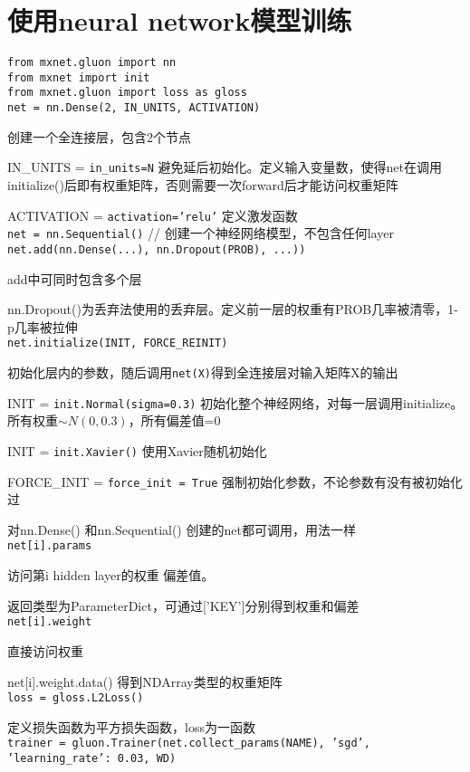 \documentclass[UTF8]{ctexart}
\begin{document}
\section{使用neural network模型训练}

\noindent \texttt{from mxnet.gluon import nn}\\
\texttt{from mxnet import init}\\
\texttt{from mxnet.gluon import loss as gloss}\\
\texttt{net = nn.Dense(2, IN\_UNITS, ACTIVATION)}

  创建一个全连接层，包含2个节点

  IN\_UNITS = \texttt{in\_units=N} 避免延后初始化。定义输入变量数，使得net在调用initialize()后即有权重矩阵，否则需要一次forward后才能访问权重矩阵
  
  ACTIVATION = \texttt{activation='relu'} 定义激发函数\\
\texttt{net = nn.Sequential()} // 创建一个神经网络模型，不包含任何layer\\
\texttt{net.add(nn.Dense(...), nn.Dropout(PROB), ...))}

  add中可同时包含多个层
  
  nn.Dropout()为丢弃法使用的丢弃层。定义前一层的权重有PROB几率被清零，1-p几率被拉伸\\
\texttt{net.initialize(INIT, FORCE\_REINIT)} 

  初始化层内的参数，随后调用\texttt{net(X)}得到全连接层对输入矩阵X的输出
  
  INIT = \texttt{init.Normal(sigma=0.3)} 初始化整个神经网络，对每一层调用initialize。所有权重$\sim N(0, 0.3)$，所有偏差值=0

  INIT = \texttt{init.Xavier()} 使用Xavier随机初始化
  
  FORCE\_INIT = \texttt{force\_init = True} 强制初始化参数，不论参数有没有被初始化过
  
  对nn.Dense() 和nn.Sequential() 创建的net都可调用，用法一样\\
\texttt{net[i].params}

  访问第i hidden layer的权重 偏差值。
  
  返回类型为ParameterDict，可通过['KEY']分别得到权重和偏差\\
\texttt{net[i].weight} 
  
  直接访问权重

  net[i].weight.data() 得到NDArray类型的权重矩阵\\
\texttt{loss = gloss.L2Loss()}
  
  定义损失函数为平方损失函数，loss为一函数\\
\texttt{trainer = gluon.Trainer(net.collect\_params(NAME), 'sgd', {'learning\_rate': 0.03}, WD)}
\end{document}
